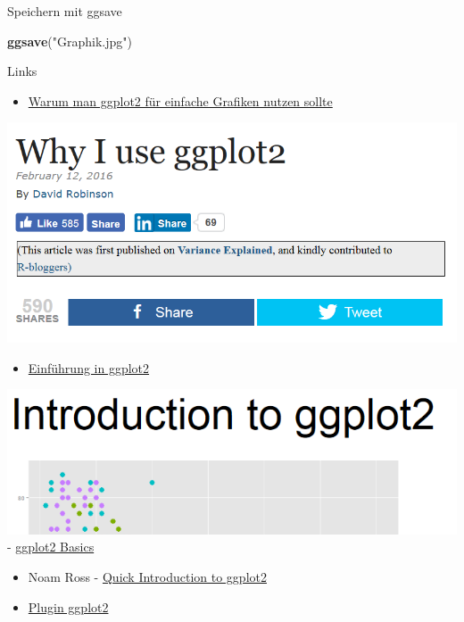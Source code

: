 \documentclass[ignorenonframetext,]{beamer}
\newenvironment{Shaded}{}{}
\newcommand{\KeywordTok}[1]{\textcolor[rgb]{0.00,0.44,0.13}{\textbf{{#1}}}}
\newcommand{\StringTok}[1]{\textcolor[rgb]{0.25,0.44,0.63}{{#1}}}
\newcommand{\NormalTok}[1]{{#1}}
\providecommand{\tightlist}{%
\setlength{\itemsep}{0pt}\setlength{\parskip}{0pt}}
\begin{document}
\begin{frame}[fragile]{Speichern mit ggsave}

\begin{Shaded}
\begin{Highlighting}[]
\KeywordTok{ggsave}\NormalTok{(}\StringTok{"Graphik.jpg"}\NormalTok{)}
\end{Highlighting}
\end{Shaded}

\end{frame}

\begin{frame}{Links}

\begin{itemize}
\tightlist
\item
  \href{http://www.r-bloggers.com/why-i-use-ggplot2/}{Warum man ggplot2
  für einfache Grafiken nutzen sollte}
\end{itemize}

\includegraphics{./tex2pdf.956/713676ac3cd032e94fe59b2c8c1b24589dad7ad2.png}

\begin{itemize}
\tightlist
\item
  \href{https://opr.princeton.edu/workshops/Downloads/2015Jan_ggplot2Koffman.pdf}{Einführung
  in ggplot2}
\end{itemize}

\includegraphics{./tex2pdf.956/46d059842565736d008f8e7cd97de8d090f2398c.png}
-
\href{http://tutorials.iq.harvard.edu/R/Rgraphics/Rgraphics.html}{ggplot2
Basics}

\begin{itemize}
\item
  Noam Ross -
  \href{http://www.noamross.net/blog/2012/10/5/ggplot-introduction.html}{Quick
  Introduction to ggplot2}
\item
  \href{https://www.r-bloggers.com/rcmdrplugin-kmggplot2_0-2-4-is-on-cran/}{Plugin
  ggplot2}
\end{itemize}

\end{frame}
\end{document}
